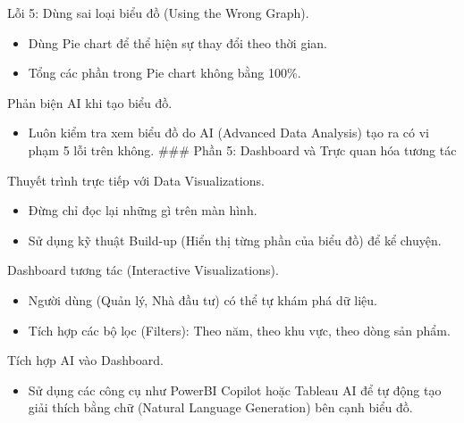\documentclass[aspectratio=169]{beamer}
\begin{document}
\begin{frame}{Lỗi 5: Dùng sai loại biểu đồ (Using the Wrong Graph).}
    \begin{itemize}
        \item Dùng Pie chart để thể hiện sự thay đổi theo thời gian.
        \item Tổng các phần trong Pie chart không bằng 100\%.
    \end{itemize}
\end{frame}


\begin{frame}{Phản biện AI khi tạo biểu đồ.}
    \begin{itemize}
        \item Luôn kiểm tra xem biểu đồ do AI (Advanced Data Analysis) tạo ra có vi phạm 5 lỗi trên không.
        ### Phần 5: Dashboard và Trực quan hóa tương tác
    \end{itemize}
\end{frame}


\begin{frame}{Thuyết trình trực tiếp với Data Visualizations.}
    \begin{itemize}
        \item Đừng chỉ đọc lại những gì trên màn hình.
        \item Sử dụng kỹ thuật Build-up (Hiển thị từng phần của biểu đồ) để kể chuyện.
    \end{itemize}
\end{frame}


\begin{frame}{Dashboard tương tác (Interactive Visualizations).}
    \begin{itemize}
        \item Người dùng (Quản lý, Nhà đầu tư) có thể tự khám phá dữ liệu.
        \item Tích hợp các bộ lọc (Filters): Theo năm, theo khu vực, theo dòng sản phẩm.
    \end{itemize}
\end{frame}


\begin{frame}{Tích hợp AI vào Dashboard.}
    \begin{itemize}
        \item Sử dụng các công cụ như PowerBI Copilot hoặc Tableau AI để tự động tạo giải thích bằng chữ (Natural Language Generation) bên cạnh biểu đồ.
    \end{itemize}
\end{frame}
\end{document}
